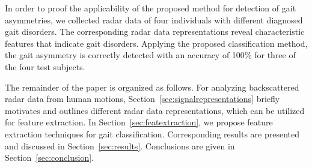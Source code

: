 In order to proof the applicability of the proposed method for detection of gait asymmetries, we collected radar data of four individuals with different diagnosed gait disorders. The corresponding radar data representations reveal characteristic features that indicate gait disorders. Applying the proposed classification method, the gait asymmetry is correctly detected with an accuracy of 100\% for three of the four test subjects.

The remainder of the paper is organized as follows. For analyzing backscattered radar data from human motions, Section~\ref{sec:signalrepresentations} briefly motivates and outlines different radar data representations, which can be utilized for feature extraction. In Section~\ref{sec:featextraction}, we propose feature extraction techniques for gait classification. Corresponding results are presented and discussed in Section~\ref{sec:results}. Conclusions are given in Section~\ref{sec:conclusion}.